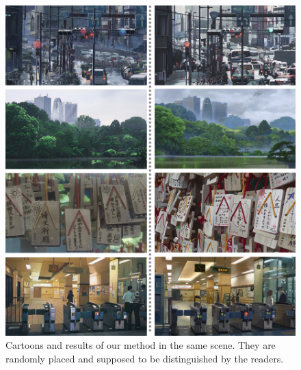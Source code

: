 \documentclass[10pt,twocolumn,letterpaper]{article}
\begin{document}
\begin{figure}[htb]
\centering
\includegraphics[width=\linewidth]{figures/compare2.pdf}
\caption{Cartoons and results of our method in the same scene. They are randomly placed and supposed to be distinguished by the readers.}
\label{fig:compare2}
\end{figure}
\end{document}
